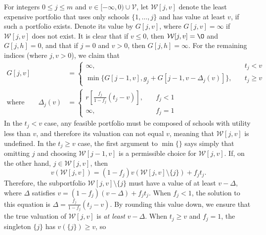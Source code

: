\documentclass[12pt]{article} %
\theoremstyle{definition}
\theoremstyle{definition}
\begin{document}
For integers $0 \leq j \leq m$ and $v \in [-\infty, 0) \cup \mathcal{V}$, let $\mathcal{W}[j, v]$ denote the least expensive portfolio that uses only schools $\{ 1, \dots, j\}$ and has value at least $v$, if such a portfolio exists. Denote its value by $G[j, v]$, where $G[j, v] = \infty$ if $\mathcal{W}[j, v]$ does not exist. It is clear that if $v \leq 0$, then $\mathcal{W}[j, v] = \O$ and $G[j, h] = 0$, and that if $j = 0$ and $v > 0$, then $G[j, h] = \infty$.  For the remaining indices (where $j, v > 0$), we claim that
\begin{align} \label{recursionrelationforcostmindp}
G[j, v] &=
\begin{cases}
\infty, \quad & t_j < v \\
\min\bigl\{G[j-1, v], g_j + G[j-1, v - \Delta_j(v)] \bigr\}, \quad & t_j \geq v 
\end{cases}\\
\text{where}\qquad
\Delta_j (v) &= 
\begin{cases}
r\left[\frac{f_j}{1 - f_j} (t_j - v)\right], \quad & f_j < 1\\
\infty, &f_j = 1
\end{cases} \label{deltajvdef}
\end{align}
In the $t_j < v$ case, any feasible portfolio must be composed of schools with utility less than $v$, and therefore its valuation can not equal $v$, meaning that $\mathcal{W}[j, v]$ is undefined. In the $t_j \geq v$ case, the first argument to $\min\{\}$ says simply that omitting $j$ and choosing $\mathcal{W}[j-1, v]$ is a permissible choice for $\mathcal{W}[j, v]$. If, on the other hand, $j \in \mathcal{W}[j, v]$, then
\begin{equation} \label{solvemeforvwjvminusj}
v(\mathcal{W}[j, v]) = (1 - f_j )v(\mathcal{W}[j, v]\setminus \{j\}) + f_j t_j.\end{equation}
Therefore, the subportfolio $\mathcal{W}[j, v]\setminus \{j\}$ must have a value of at least $v - \Delta$, where $\Delta$ satisfies $v = (1 - f_j )(v - \Delta) + f_j t_j $. When $f_j < 1$, the solution to this equation is $ \Delta = \frac{f_j}{1 - f_j} (t_j - v)$. By rounding this value down, we ensure that the true valuation of $\mathcal{W}[j, v]$ is \emph{at least} $v - \Delta$. When $t_j \geq v$ and $f_j = 1$, the singleton $\{j\}$ has $v(\{j\}) \geq v$, so
\end{document}
